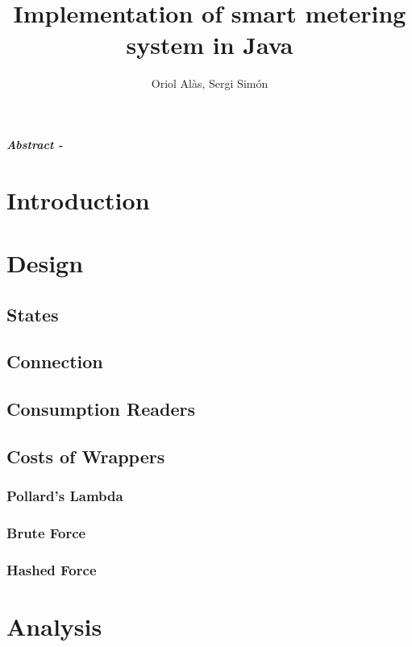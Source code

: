 \documentclass{article}
\title{Implementation of smart metering system in Java}
\author{Oriol Alàs, Sergi Simón}
\begin{document}
   \maketitle
   
   \textbf{\textit{Abstract - }}
   \section{Introduction}
   
   \section{Design}
   
   \subsection{States}
   
   \subsection{Connection}
   
   \subsection{Consumption Readers}
   
   \subsection{Costs of Wrappers}
   \label{wrapp:sec}
   \subsubsection{Pollard's Lambda}
   \subsubsection{Brute Force}
   \subsubsection{Hashed Force}
   \section{Analysis}
\end{document}
